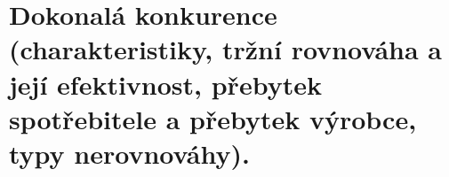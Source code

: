 \clearpage
\section{Dokonalá konkurence (charakteristiky, tržní rovnováha a její efektivnost, přebytek
spotřebitele a přebytek výrobce, typy nerovnováhy).}